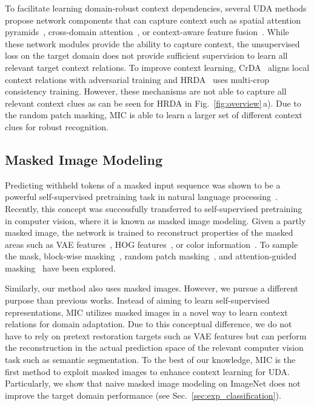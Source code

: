 \documentclass[10pt,twocolumn,letterpaper]{article}
\begin{document}
To facilitate learning domain-robust context dependencies, several UDA methods propose network components that can capture context such as spatial attention pyramids~\cite{li2020spatial}, cross-domain attention~\cite{yang2021context}, or context-aware feature fusion~\cite{hoyer2021daformer}. 
While these network modules provide the ability to capture context, the unsupervised loss on the target domain does not provide sufficient supervision to learn all relevant target context relations. 
To improve context learning, CrDA~\cite{huang2020contextual} aligns local context relations with adversarial training and HRDA~\cite{hoyer2022hrda} uses multi-crop consistency training. However, these mechanisms are not able to capture all relevant context clues as can be seen for HRDA in Fig.~\ref{fig:overview}\,a).
Due to the random patch masking, MIC is able to learn a larger set of different context clues for robust recognition.


\subsection{Masked Image Modeling}

Predicting withheld tokens of a masked input sequence was shown to be a powerful self-supervised pretraining task in natural language processing~\cite{devlin2018bert, brown2020language}. 
Recently, this concept was successfully transferred to self-supervised pretraining in computer vision, where it is known as masked image modeling. Given a partly masked image, the network is trained to reconstruct properties of the masked areas such as VAE features~\cite{bao2021beit,dong2021peco,li2022mc}, HOG features~\cite{wei2022masked}, or color information~\cite{he2022masked,xie2022simmim}. To sample the mask, block-wise masking~\cite{bao2021beit}, random patch masking~\cite{he2022masked,xie2022simmim}, and attention-guided masking~\cite{li2021mst,kakogeorgiou2022hide} have been explored.


Similarly, our method also uses masked images. However, we pursue a different purpose than previous works. Instead of aiming to learn self-supervised representations, MIC utilizes masked images in a novel way to learn context relations for domain adaptation. Due to this conceptual difference, we do not have to rely on pretext restoration targets such as VAE features but can perform the reconstruction in the actual prediction space of the relevant computer vision task such as semantic segmentation. To the best of our knowledge, MIC is the first method to exploit masked images to enhance context learning for UDA.
Particularly, we show that naive masked image modeling on ImageNet does not improve the target domain performance (see Sec.~\ref{sec:exp_classification}).
 
\end{document}
